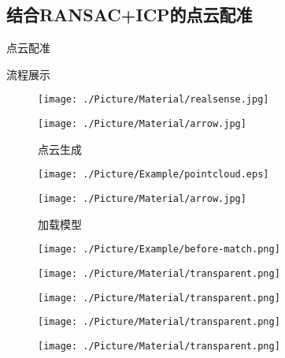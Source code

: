 \documentclass[xcolor=table,compress,blue]{beamer}
\begin{document}
  \subsection{结合RANSAC+ICP的点云配准}
	\begin{frame}{点云配准}
		\begin{exampleblock}{流程展示}
			\begin{figure}[htpb]
				\centering
				\begin{minipage}[b]{0.8in}
					\centerline{ \texttt{[image: ./Picture/Material/realsense.jpg]} }
				\end{minipage}
				\begin{minipage}[b]{0.8in}
					\centerline{ \quad}
					\centerline{ \texttt{[image: ./Picture/Material/arrow.jpg]} }
					\centerline{\tiny{点云生成}}
				\end{minipage}
				\begin{minipage}[b]{0.8in}
					\centerline{ \texttt{[image: ./Picture/Example/pointcloud.eps]} }
				\end{minipage}
				\begin{minipage}[b]{0.8in}
					\centerline{ \texttt{[image: ./Picture/Material/arrow.jpg]} }
					\centerline{\tiny{加载模型}}
				\end{minipage}
				\begin{minipage}[b]{0.8in}
					\centerline{ \texttt{[image: ./Picture/Example/before-match.png]} }
				\end{minipage}
			\end{figure}
			\vspace{-25pt}
			\begin{figure}[htpb]
				\centering
				\begin{minipage}[b]{0.8in}
					\centerline{ \texttt{[image: ./Picture/Material/transparent.png]} }
				\end{minipage}
				\begin{minipage}[b]{0.8in}
					\centerline{ \texttt{[image: ./Picture/Material/transparent.png]} }
				\end{minipage}
				\begin{minipage}[b]{0.8in}
					\centerline{ \texttt{[image: ./Picture/Material/transparent.png]} }
				\end{minipage}
				\begin{minipage}[b]{0.8in}
					\centerline{ \texttt{[image: ./Picture/Material/transparent.png]} }

\end{minipage}
\end{figure}
\end{exampleblock}
\end{frame}
\end{document}
